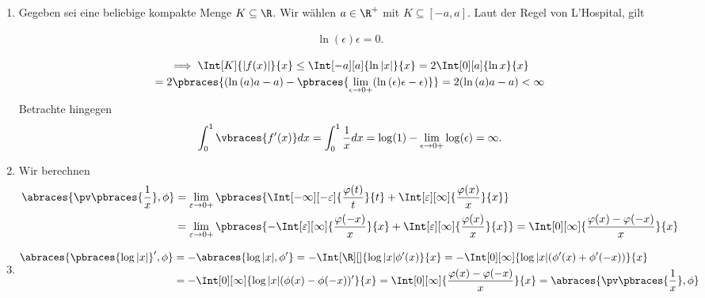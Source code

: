 
\begin{solution}

\phantom{}

\begin{enumerate}[label = (\roman*)]

    \item Gegeben sei eine beliebige kompakte Menge $K \subseteq \R$.
    Wir wählen $a \in \R^+$ mit $K \subseteq [-a, a]$.
    Laut der Regel von L'Hospital, gilt

    \begin{align*}
        \ln{(\epsilon)} \epsilon = 0.
    \end{align*}

    \begin{multline*}
        \implies
        \Int[K]{|f(x)|}{x}
        \leq
        \Int[-a][a]{\ln{|x|}}{x}
        =
        2 \Int[0][a]{\ln{x}}{x} \\
        =
        2 \pbraces
        {
            (\ln{(a)} a - a)
            -
            \pbraces
            {
                \lim_{\epsilon \to 0+}
                (\ln{(\epsilon)} \epsilon - \epsilon)
            }
        }
        =
        2 (\ln{(a)} a - a) < \infty
	\end{multline*}
	Betrachte hingegen 
	\begin{align*}
	\int_0^1 \vbraces{f^\prime(x)} dx = \int_0^1 \frac{1}{x} dx = \log(1) - \lim_{\epsilon \to 0+} \log(\epsilon) = \infty.
	\end{align*}
	\item Wir berechnen
	\begin{align*}
	\abraces{\pv\pbraces{\frac{1}{x}}, \phi} &= \lim_{\varepsilon \to 0+}
	\pbraces
	{
		\Int[-\infty][-\varepsilon]
		{
			\frac{\varphi(t)}{t}
		}{t}
		+
		\Int[\varepsilon][\infty]
		{
			\frac{\varphi(x)}{x}
		}{x}
	} \\
	&= \lim_{\varepsilon \to 0+}
	\pbraces
	{
	-\Int[\varepsilon][\infty]
	{
		\frac{\varphi(-x)}{x}
	}{x}
	+
	\Int[\varepsilon][\infty]
	{
		\frac{\varphi(x)}{x}
	}{x}
	} = \Int[0][\infty]{\frac{\varphi(x) - \varphi(-x)}{x}}{x}
	\end{align*}
	\item 
	\begin{align*}
	\abraces{\pbraces{\log|x|}^\prime, \phi} &= -\abraces{\log|x|, \phi^\prime} = -\Int[\R][]{\log|x| \phi^\prime(x)}{x} = -\Int[0][\infty]{\log|x| (\phi^\prime(x) + \phi^\prime(-x))}{x} \\
	&= -\Int[0][\infty]{\log|x| (\phi(x) - \phi(-x))^\prime}{x} = \Int[0][\infty]{\frac{\varphi(x) - \varphi(-x)}{x}}{x} = \abraces{\pv\pbraces{\frac{1}{x}}, \phi}
	\end{align*}
\end{enumerate}

\end{solution}

